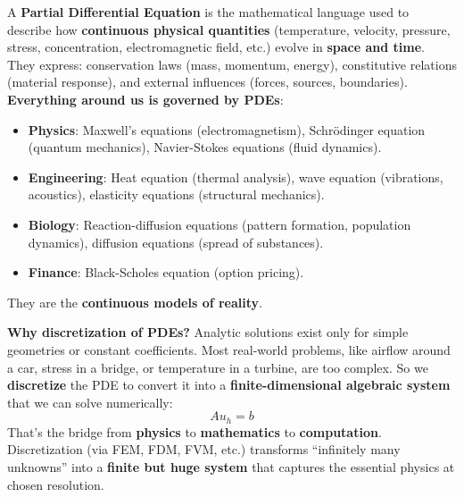 \highspace
\begin{deepeningbox}[: PDE]
    A \textbf{Partial Differential Equation} is the mathematical language used to describe how \textbf{continuous physical quantities} (temperature, velocity, pressure, stress, concentration, electromagnetic field, etc.) evolve in \textbf{space and time}. They express: conservation laws (mass, momentum, energy), constitutive relations (material response), and external influences (forces, sources, boundaries). \textbf{Everything around us is governed by PDEs}:
    \begin{itemize}
        \item \textbf{Physics}: Maxwell's equations (electromagnetism), Schrödinger equation (quantum mechanics), Navier-Stokes equations (fluid dynamics).
        \item \textbf{Engineering}: Heat equation (thermal analysis), wave equation (vibrations, acoustics), elasticity equations (structural mechanics).
        \item \textbf{Biology}: Reaction-diffusion equations (pattern formation, population dynamics), diffusion equations (spread of substances).
        \item \textbf{Finance}: Black-Scholes equation (option pricing).
    \end{itemize}
    They are the \textbf{continuous models of reality}.

    \highspace
    \textcolor{Green3}{ \textbf{Why discretization of PDEs?}} Analytic solutions exist only for simple geometries or constant coefficients. Most real-world problems, like airflow around a car, stress in a bridge, or temperature in a turbine, are too complex. So we \textbf{discretize} the PDE to convert it into a \textbf{finite-dimensional algebraic system} that we can solve numerically:
    \begin{equation*}
        A u_{h} = b
    \end{equation*}
    That's the bridge from \textbf{physics} to \textbf{mathematics} to \textbf{computation}. Discretization (via FEM, FDM, FVM, etc.) transforms ``infinitely many unknowns'' into a \textbf{finite but huge system} that captures the essential physics at chosen resolution.


\end{deepeningbox}
